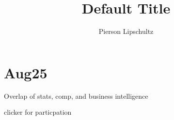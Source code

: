 \documentclass{article}
\title{Default Title}
\author{Pierson Lipschultz}
\begin{document}
\section{Aug25}
    \begin{list}{-}{}
        \item Overlap of stats, comp, and business intelligence
        \item clicker for particpation
    \end{list}
\end{document}

